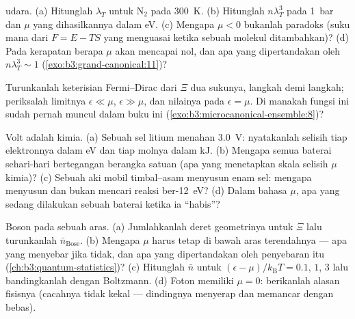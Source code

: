 \begin{exercise}[$\star$]\label{exo:b3:grand-canonical:2}
 udara. (a) Hitunglah $\lambda_T$ untuk N$_2$
pada \qty{300}{K}. (b) Hitunglah $n\lambda_T^3$ pada \qty{1}{bar} dan
$\mu$ yang dihasilkannya dalam eV. (c) Mengapa $\mu < 0$ bukanlah
paradoks (suku mana dari $F = E - TS$ yang menguasai ketika sebuah
molekul ditambahkan)? (d) Pada kerapatan berapa $\mu$ akan mencapai nol,
dan apa yang dipertandakan oleh
$n\lambda_T^3 \sim 1$
(\cref{exo:b3:grand-canonical:11})?
\end{exercise}

\begin{exercise}[$\star$]\label{exo:b3:grand-canonical:3}
Turunkanlah keterisian Fermi--Dirac dari $\Xi$ dua sukunya,
langkah demi langkah; periksalah limitnya $\epsilon \ll \mu$, $\epsilon \gg
\mu$, dan nilainya pada $\epsilon = \mu$. Di manakah fungsi ini sudah
pernah muncul dalam buku ini
(\cref{exo:b3:microcanonical-ensemble:8})?
\end{exercise}

\begin{exercise}[$\star$]\label{exo:b3:grand-canonical:4}
Volt adalah kimia. (a) Sebuah sel litium menahan \qty{3.0}{V}:
nyatakanlah selisih  tiap elektronnya dalam eV dan
tiap molnya dalam kJ. (b) Mengapa semua baterai sehari-hari bertegangan
berangka satuan (apa yang menetapkan skala selisih $\mu$ kimia)? (c)
Sebuah aki mobil timbal--asam menyusun enam sel: mengapa menyusun dan
bukan mencari reaksi ber-\qty{12}{eV}? (d) Dalam bahasa $\mu$, apa yang
sedang dilakukan sebuah baterai ketika ia ``habis''?
\end{exercise}

\begin{exercise}[$\star\star$]\label{exo:b3:grand-canonical:5}
Boson pada sebuah aras. (a) Jumlahkanlah deret geometrinya untuk $\Xi$
lalu turunkanlah $\bar n_{\text{Bose}}$. (b) Mengapa $\mu$ harus tetap di
bawah aras terendahnya --- apa yang menyebar jika tidak, dan apa yang
dipertandakan oleh penyebaran itu (\cref{ch:b3:quantum-statistics})? (c)
Hitunglah $\bar n$ untuk $(\epsilon - \mu)/k_{\text{B}}T = 0.1$, $1$,
$3$ lalu bandingkanlah dengan Boltzmann. (d) Foton memiliki $\mu = 0$:
berikanlah alasan fisisnya (cacahnya tidak kekal --- dindingnya menyerap
dan memancar dengan bebas).
\end{exercise}

